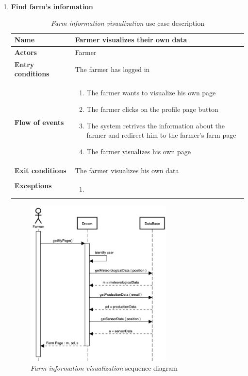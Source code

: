 \begin{enumerate}
    \item \textbf{Find farm’s information}
    \begin{longtable}{p{0.26\linewidth}p{0.75\linewidth}}
        \toprule
        \textbf{Name} & \textbf{Farmer visualizes their own data} \\
        \midrule
        \textbf{Actors} & Farmer \\
        \midrule
        \textbf{Entry conditions} & The farmer has logged in\\
        \midrule
        \textbf{Flow of events} & 
        \begin{enumerate}
            \item The farmer wants to visualize his own page
            \item The farmer clicks on the profile page button
            \item The system retrives the information about the farmer and redirect him to the farmer's farm page
            \item The farmer visualizes his own page
        \end{enumerate} \\
        \midrule
        \textbf{Exit conditions} & The farmer visualizes his own data\\
        \midrule
        \textbf{Exceptions} & 
        \begin{enumerate}
            \item
        \end{enumerate}\\
        \bottomrule
        \caption{\emph{Farm information visualization} use case description}
    \end{longtable}

    \begin{figure}[H]
        \begin{center}
        \includegraphics[width=0.7\textwidth]{sequence/FarmInformation.png}
        \caption{\emph{Farm information visualization} sequence diagram}
        \label{fig:sequence6}
        \end{center}
    \end{figure}


\end{enumerate}
